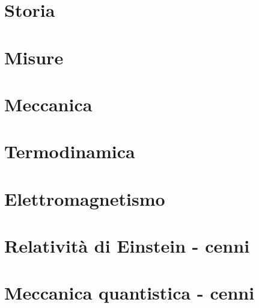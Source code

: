 
\part{Storia}


\part{Misure}


\part{Meccanica}


\part{Termodinamica}


\part{Elettromagnetismo}


\part{Relatività di Einstein - cenni}


\part{Meccanica quantistica - cenni}

